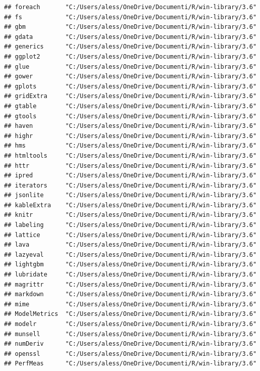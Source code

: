 \documentclass[]{article}
\begin{document}
\begin{verbatim}
## foreach       "C:/Users/aless/OneDrive/Documenti/R/win-library/3.6"
## fs            "C:/Users/aless/OneDrive/Documenti/R/win-library/3.6"
## gbm           "C:/Users/aless/OneDrive/Documenti/R/win-library/3.6"
## gdata         "C:/Users/aless/OneDrive/Documenti/R/win-library/3.6"
## generics      "C:/Users/aless/OneDrive/Documenti/R/win-library/3.6"
## ggplot2       "C:/Users/aless/OneDrive/Documenti/R/win-library/3.6"
## glue          "C:/Users/aless/OneDrive/Documenti/R/win-library/3.6"
## gower         "C:/Users/aless/OneDrive/Documenti/R/win-library/3.6"
## gplots        "C:/Users/aless/OneDrive/Documenti/R/win-library/3.6"
## gridExtra     "C:/Users/aless/OneDrive/Documenti/R/win-library/3.6"
## gtable        "C:/Users/aless/OneDrive/Documenti/R/win-library/3.6"
## gtools        "C:/Users/aless/OneDrive/Documenti/R/win-library/3.6"
## haven         "C:/Users/aless/OneDrive/Documenti/R/win-library/3.6"
## highr         "C:/Users/aless/OneDrive/Documenti/R/win-library/3.6"
## hms           "C:/Users/aless/OneDrive/Documenti/R/win-library/3.6"
## htmltools     "C:/Users/aless/OneDrive/Documenti/R/win-library/3.6"
## httr          "C:/Users/aless/OneDrive/Documenti/R/win-library/3.6"
## ipred         "C:/Users/aless/OneDrive/Documenti/R/win-library/3.6"
## iterators     "C:/Users/aless/OneDrive/Documenti/R/win-library/3.6"
## jsonlite      "C:/Users/aless/OneDrive/Documenti/R/win-library/3.6"
## kableExtra    "C:/Users/aless/OneDrive/Documenti/R/win-library/3.6"
## knitr         "C:/Users/aless/OneDrive/Documenti/R/win-library/3.6"
## labeling      "C:/Users/aless/OneDrive/Documenti/R/win-library/3.6"
## lattice       "C:/Users/aless/OneDrive/Documenti/R/win-library/3.6"
## lava          "C:/Users/aless/OneDrive/Documenti/R/win-library/3.6"
## lazyeval      "C:/Users/aless/OneDrive/Documenti/R/win-library/3.6"
## lightgbm      "C:/Users/aless/OneDrive/Documenti/R/win-library/3.6"
## lubridate     "C:/Users/aless/OneDrive/Documenti/R/win-library/3.6"
## magrittr      "C:/Users/aless/OneDrive/Documenti/R/win-library/3.6"
## markdown      "C:/Users/aless/OneDrive/Documenti/R/win-library/3.6"
## mime          "C:/Users/aless/OneDrive/Documenti/R/win-library/3.6"
## ModelMetrics  "C:/Users/aless/OneDrive/Documenti/R/win-library/3.6"
## modelr        "C:/Users/aless/OneDrive/Documenti/R/win-library/3.6"
## munsell       "C:/Users/aless/OneDrive/Documenti/R/win-library/3.6"
## numDeriv      "C:/Users/aless/OneDrive/Documenti/R/win-library/3.6"
## openssl       "C:/Users/aless/OneDrive/Documenti/R/win-library/3.6"
## PerfMeas      "C:/Users/aless/OneDrive/Documenti/R/win-library/3.6"

\end{verbatim}
\end{document}
